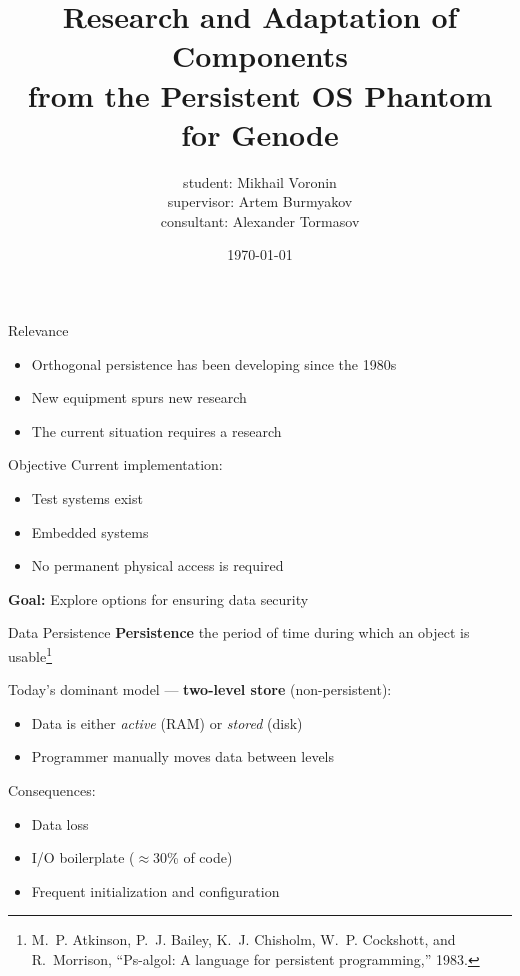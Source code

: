\documentclass{beamer}
\title{Research and Adaptation of Components\\from the Persistent OS Phantom for Genode}
\author{student: Mikhail Voronin\\supervisor: Artem Burmyakov\\consultant: Alexander Tormasov}
\date{\monthYear\today}
\begin{document}
\frame{\titlepage}


\begin{frame}{Relevance}
    \begin{itemize}
        \item Orthogonal persistence has been developing since the 1980s
        \item New equipment spurs new research
        \item The current situation requires a research
    \end{itemize}
\end{frame}


\begin{frame}{Objective}
    Current implementation:
    \begin{itemize}
        \item Test systems exist
        \item Embedded systems
        \item No permanent physical access is required
    \end{itemize}

    \bigskip

    \textbf{Goal:} Explore options for ensuring data security
\end{frame}


\begin{frame}{Data Persistence}
    \textbf{Persistence} the period of time during which an object is usable\footnote{M.~P. Atkinson, P.~J. Bailey, K.~J. Chisholm, W.~P. Cockshott, and R.~Morrison, ``Ps-algol: A language for persistent programming,'' 1983.}

    \bigskip
    Today's dominant model --- \textbf{two-level store} (non-persistent):
    \begin{itemize}
        \item Data is either \textit{active} (RAM) or \textit{stored} (disk)
        \item Programmer manually moves data between levels
        
    \end{itemize}
    \bigskip

    Consequences:
    \begin{itemize}
        \item Data loss
        \item I/O boilerplate ($\approx$30\% of code)
        \item Frequent initialization and configuration
    \end{itemize}
\end{frame}
\end{document}
